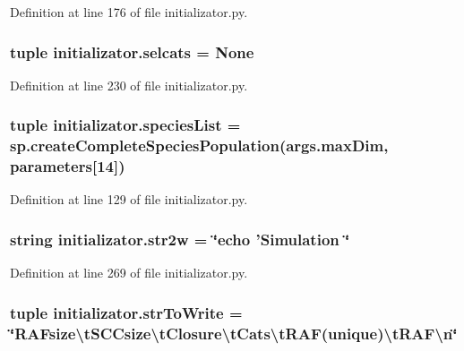 Definition at line 176 of file initializator.\-py.

\hypertarget{a00104_af6c2d44ddc6d15e90ea900d7abb94718}{
\subsubsection[{selcats}]{\setlength{\rightskip}{0pt plus 5cm}tuple initializator.\-selcats = None}}\label{a00104_af6c2d44ddc6d15e90ea900d7abb94718}


Definition at line 230 of file initializator.\-py.

\hypertarget{a00104_a79af2b1d3fe38f2cd259cc56b1ecc5f3}{
\subsubsection[{species\-List}]{\setlength{\rightskip}{0pt plus 5cm}tuple initializator.\-species\-List = sp.\-create\-Complete\-Species\-Population(args.\-max\-Dim, {\bf parameters}\mbox{[}14\mbox{]})}}\label{a00104_a79af2b1d3fe38f2cd259cc56b1ecc5f3}


Definition at line 129 of file initializator.\-py.

\hypertarget{a00104_af4f7037cc1fb349cdc7cf9425c724398}{
\subsubsection[{str2w}]{\setlength{\rightskip}{0pt plus 5cm}string initializator.\-str2w = \char`\"{}echo 'Simulation \char`\"{}}}\label{a00104_af4f7037cc1fb349cdc7cf9425c724398}


Definition at line 269 of file initializator.\-py.

\hypertarget{a00104_a2425798997b1c46c8bbed77ecffcaa9f}{
\subsubsection[{str\-To\-Write}]{\setlength{\rightskip}{0pt plus 5cm}tuple initializator.\-str\-To\-Write = \char`\"{}R\-A\-Fsize\textbackslash{}t\-S\-C\-Csize\textbackslash{}t\-Closure\textbackslash{}t\-Cats\textbackslash{}t\-R\-A\-F(unique)\textbackslash{}t\-R\-A\-F\textbackslash{}n\char`\"{}}}\label{a00104_a2425798997b1c46c8bbed77ecffcaa9f}


